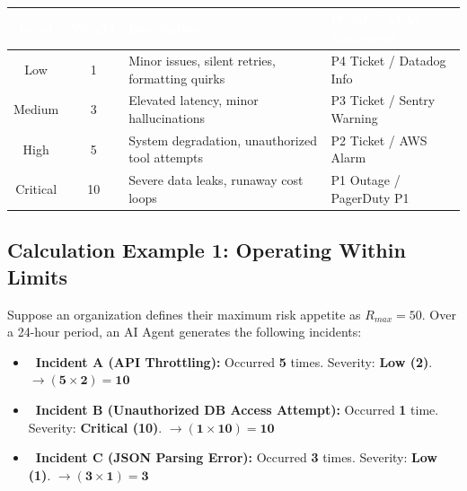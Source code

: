 \documentclass[11pt,a4paper]{article}
\begin{document}
\begin{table}[H]
\centering
\renewcommand{\arraystretch}{1.5}
\small
{}
\begin{tabularx}{\textwidth}{| c | c | >{\raggedright\arraybackslash}X | >{\raggedright\arraybackslash}X |}
\hline
\rowcolor{dpiblue} \textcolor{white}{\textbf{Level}} & \textcolor{white}{\textbf{Weight}} & \textcolor{white}{\textbf{Description}} & \textcolor{white}{\textbf{ITSM / APM Equivalent}} \\
\hline
Low & 1 & Minor issues, silent retries, formatting quirks & P4 Ticket / Datadog Info \\
Medium & 3 & Elevated latency, minor hallucinations & P3 Ticket / Sentry Warning \\
High & 5 & System degradation, unauthorized tool attempts & P2 Ticket / AWS Alarm \\
Critical & 10 & Severe data leaks, runaway cost loops & P1 Outage / PagerDuty P1 \\
\hline
\end{tabularx}
\end{table}

\subsection{\textcolor{dpiteal}{Calculation Example 1: Operating Within Limits}}
Suppose an organization defines their maximum risk appetite as \textbf{$R_{max} = 50$}. Over a 24-hour period, an AI Agent generates the following incidents:

\vspace{0.3cm}
\begin{tcolorbox}[enhanced, colback=white, colframe=dpiteal, boxrule=1pt, arc=2mm, title={\textbf{\faClipboardList\ Incident Log (24 Hours)}}, fonttitle=\bfseries]
\begin{itemize}
    \item \textbf{\color{dpicloud}\faBug\ Incident A (API Throttling):} Occurred \textbf{5} times. Severity: \textbf{Low (2)}. \hfill $\rightarrow \mathbf{(5 \times 2) = 10}$
    \item \textbf{\color{dpired}\faUserShield\ Incident B (Unauthorized DB Access Attempt):} Occurred \textbf{1} time. Severity: \textbf{Critical (10)}. \hfill $\rightarrow \mathbf{(1 \times 10) = 10}$
    \item \textbf{\color{dpicloud}\faCode\ Incident C (JSON Parsing Error):} Occurred \textbf{3} times. Severity: \textbf{Low (1)}. \hfill $\rightarrow \mathbf{(3 \times 1) = 3}$
\end{itemize}
\end{tcolorbox}
\vspace{0.3cm}
\end{document}

